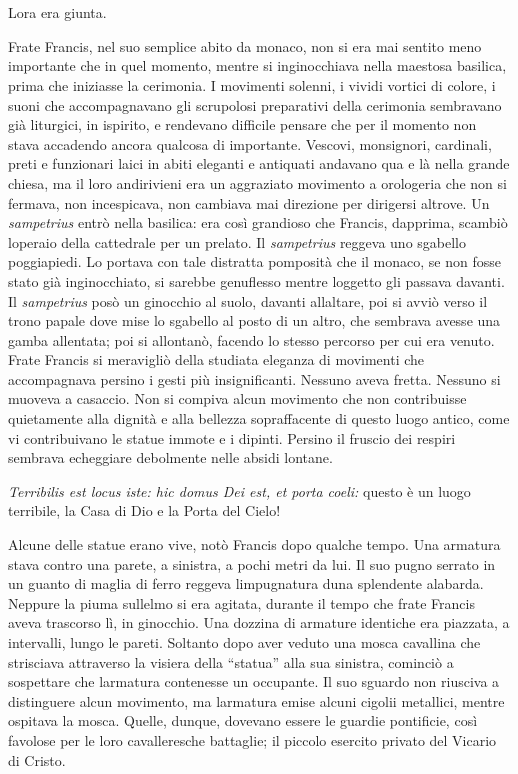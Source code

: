 	\chapter{\phantom{title}}

\lettrine{L}{}\textquotesingle ora era giunta.

Frate Francis, nel suo semplice abito da monaco, non si era mai sentito
meno importante che in quel momento, mentre si inginocchiava nella
maestosa basilica, prima che iniziasse la cerimonia. I movimenti
solenni, i vividi vortici di colore, i suoni che accompagnavano gli
scrupolosi preparativi della cerimonia sembravano già liturgici, in
ispirito, e rendevano difficile pensare che per il momento non stava
accadendo ancora qualcosa di importante. Vescovi, monsignori, cardinali,
preti e funzionari laici in abiti eleganti e antiquati andavano qua e là
nella grande chiesa, ma il loro andirivieni era un aggraziato movimento
a orologeria che non si fermava, non incespicava, non cambiava mai
direzione per dirigersi altrove. Un \emph{sampetrius} entrò nella
basilica: era così grandioso che Francis, dapprima, scambiò
l\textquotesingle operaio della cattedrale per un prelato. Il
\emph{sampetrius} reggeva uno sgabello poggiapiedi. Lo portava con tale
distratta pomposità che il monaco, se non fosse stato già inginocchiato,
si sarebbe genuflesso mentre l\textquotesingle oggetto gli passava
davanti. Il \emph{sampetrius} posò un ginocchio al suolo, davanti
all\textquotesingle altare, poi si avviò verso il trono papale dove mise
lo sgabello al posto di un altro, che sembrava avesse una gamba
allentata; poi si allontanò, facendo lo stesso percorso per cui era
venuto. Frate Francis si meravigliò della studiata eleganza di movimenti
che accompagnava persino i gesti più insignificanti. Nessuno aveva
fretta. Nessuno si muoveva a casaccio. Non si compiva alcun movimento
che non contribuisse quietamente alla dignità e alla bellezza
sopraffacente di questo luogo antico, come vi contribuivano le statue
immote e i dipinti. Persino il fruscio dei respiri sembrava echeggiare
debolmente nelle absidi lontane.

\emph{Terribilis est locus iste: hic domus Dei est, et porta coeli:}
questo è un luogo terribile, la Casa di Dio e la Porta del Cielo!

Alcune delle statue erano vive, notò Francis dopo qualche tempo. Una
armatura stava contro una parete, a sinistra, a pochi metri da lui. Il
suo pugno serrato in un guanto di maglia di ferro reggeva
l\textquotesingle impugnatura d\textquotesingle una splendente alabarda.
Neppure la piuma sull\textquotesingle elmo si era agitata, durante il
tempo che frate Francis aveva trascorso lì, in ginocchio. Una dozzina di
armature identiche era piazzata, a intervalli, lungo le pareti. Soltanto
dopo aver veduto una mosca cavallina che strisciava attraverso la
visiera della ``statua'' alla sua sinistra, cominciò a sospettare che
l\textquotesingle armatura contenesse un occupante. Il suo sguardo non
riusciva a distinguere alcun movimento, ma l\textquotesingle armatura
emise alcuni cigolii metallici, mentre ospitava la mosca. Quelle,
dunque, dovevano essere le guardie pontificie, così favolose per le loro
cavalleresche battaglie; il piccolo esercito privato del Vicario di
Cristo.


